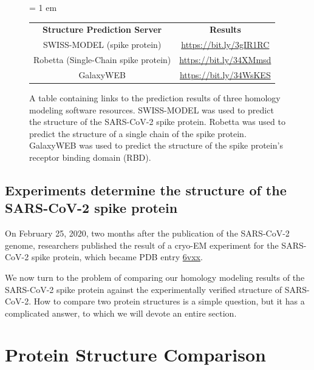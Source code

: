 \begin{figure}[h]
	\centering
	\tabcolsep = 1 em
	\mySfFamily
	\begin{tabular}{c c}
		\textbf{Structure Prediction Server} & \textbf{Results} \\
		SWISS-MODEL (spike protein) & \url{https://bit.ly/3gIR1RC} \\
		Robetta (Single-Chain spike protein) & \url{https://bit.ly/34XMmsd} \\
		GalaxyWEB & \url{https://bit.ly/34WsKES} \\
	\end{tabular}
	\caption{A table containing links to the prediction results of three homology modeling software resources. SWISS-MODEL was used to predict the structure of the SARS-CoV-2 spike protein. Robetta was used to predict the structure of a single chain of the spike protein. GalaxyWEB was used to predict the structure of the spike protein's receptor binding domain (RBD).}
	\label{fig:homology_modeling_results_table}
\end{figure}

\subsection{Experiments determine the structure of the SARS-CoV-2 spike protein}

On February 25, 2020, two months after the publication of the SARS-CoV-2 genome, researchers published the result of a cryo-EM experiment for the SARS-CoV-2 spike protein, which became PDB entry \href{http://www.rcsb.org/structure/6vxx}{6vxx}.\\

\begin{note}\end{note}

We now turn to the problem of comparing our homology modeling results of the SARS-CoV-2 spike protein against the experimentally verified structure of SARS-CoV-2. How to compare two protein structures is a simple question, but it has a complicated answer, to which we will devote an entire section.\\

\FloatBarrier
{}

\section{Protein Structure Comparison}
\label{sec:accuracy}

